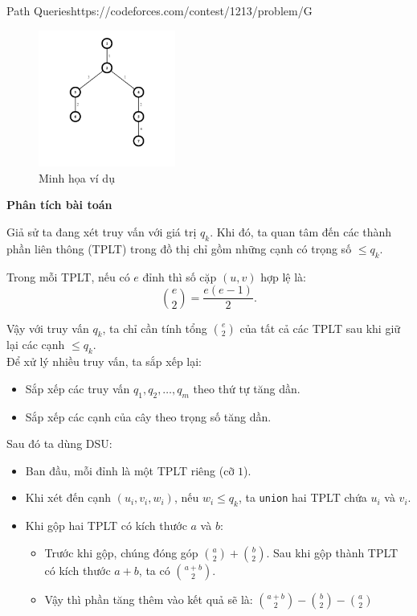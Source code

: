 \begin{baitap}{Path Queries}{https://codeforces.com/contest/1213/problem/G}
\begin{figure}[h]
    \centering
    \includegraphics[width=0.4\textwidth]{resource/img/b8/path_queries_1.png}
    \caption{Minh họa ví dụ}
\end{figure}

\end{baitap}

\textbf{Phân tích bài toán}


Giả sử ta đang xét truy vấn với giá trị $q_k$. Khi đó, ta quan tâm đến các thành phần liên thông (TPLT) trong đồ thị chỉ gồm những cạnh có trọng số $\leq q_k$.  

Trong mỗi TPLT, nếu có $e$ đỉnh thì số cặp $(u,v)$ hợp lệ là:
\[
\binom{e}{2} = \frac{e(e-1)}{2}.
\]

Vậy với truy vấn $q_k$, ta chỉ cần tính tổng $\binom{e}{2}$ của tất cả các TPLT sau khi giữ lại các cạnh $\leq q_k$.\\

Để xử lý nhiều truy vấn, ta sắp xếp lại:

\begin{itemize}
    \item Sắp xếp các truy vấn $q_1, q_2, \dots, q_m$ theo thứ tự tăng dần.
    \item Sắp xếp các cạnh của cây theo trọng số tăng dần.
\end{itemize}

Sau đó ta dùng DSU:

\begin{itemize}
    \item Ban đầu, mỗi đỉnh là một TPLT riêng (cỡ $1$).
    \item Khi xét đến cạnh $(u_i, v_i, w_i)$, nếu $w_i \leq q_k$, ta \texttt{union} hai TPLT chứa $u_i$ và $v_i$.
    \item Khi gộp hai TPLT có kích thước $a$ và $b$:
    \begin{itemize}
        \item Trước khi gộp, chúng đóng góp $\binom{a}{2} + \binom{b}{2}$. Sau khi gộp thành TPLT có kích thước $a + b$, ta có $\binom{a + b}{2}$.
        \item Vậy thì phần tăng thêm vào kết quả sẽ là: $\binom{a + b}{2} - \binom{b}{2} - \binom{a}{2}$
    \end{itemize}
\end{itemize}


